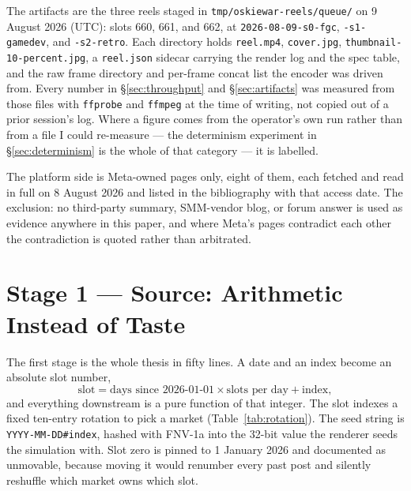 \documentclass[10pt,letterpaper,twocolumn]{article}
\newcommand{\code}[1]{\texttt{#1}}
\begin{document}
The artifacts are the three reels staged in
\code{tmp/\allowbreak oskiewar-reels/\allowbreak queue/} on 9 August 2026 (UTC): slots 660, 661, and
662, at \code{2026-08-09-s0-fgc}, \code{-s1-gamedev}, and \code{-s2-retro}. Each
directory holds \code{reel.mp4}, \code{cover.jpg},
\code{thumbnail-10-percent.jpg}, a \code{reel.json} sidecar carrying the render
log and the spec table, and the raw frame directory and per-frame concat list
the encoder was driven from. Every number in \S\ref{sec:throughput} and
\S\ref{sec:artifacts} was measured from those files with \code{ffprobe} and
\code{ffmpeg} \cite{ffmpeg} at the time of writing, not copied out of a prior
session's log. Where a figure comes from the operator's own run rather than from
a file I could re-measure --- the determinism experiment in
\S\ref{sec:determinism} is the whole of that category --- it is labelled.

The platform side is Meta-owned pages only, eight of them, each fetched and read
in full on 8 August 2026 and listed in the bibliography with that access date.
The exclusion: no third-party summary, SMM-vendor blog, or forum answer is used
as evidence anywhere in this paper, and where Meta's pages contradict each other
the contradiction is quoted rather than arbitrated.

\section{Stage 1 --- Source: Arithmetic Instead of Taste}

The first stage is the whole thesis in fifty lines. A date and an index become
an absolute slot number,
\[
\text{slot} = \text{days since 2026-01-01} \times \text{slots per day} + \text{index},
\]
and everything downstream is a pure function of that integer. The slot indexes a
fixed ten-entry rotation to pick a market (Table~\ref{tab:rotation}). The seed
string is \code{YYYY-MM-DD\#index}, hashed with FNV-1a into the 32-bit value the
renderer seeds the simulation with. Slot zero is pinned to 1 January 2026 and
documented as unmovable, because moving it would renumber every past post and
silently reshuffle which market owns which slot.
\end{document}

